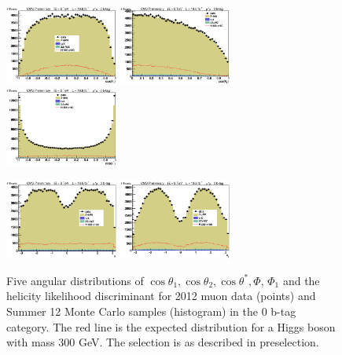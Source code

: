 \begin{figure}[thb!]
\centerline{
\includegraphics[width=0.33\textwidth]{presentation/defense/images/preselection/0/mu/costheta1.eps}
\includegraphics[width=0.33\textwidth]{presentation/defense/images/preselection/0/mu/costheta2.eps}
\includegraphics[width=0.33\textwidth]{presentation/defense/images/preselection/0/mu/costhetast.eps}
}
\centerline{
\includegraphics[width=0.33\textwidth]{presentation/defense/images/preselection/0/mu/phi.eps}
\includegraphics[width=0.33\textwidth]{presentation/defense/images/preselection/0/mu/phi1.eps}
}
\caption{
Five angular distributions of $\cos\theta_1, \cos\theta_2, \cos\theta^*, \Phi$, $\Phi_1$ and the helicity likelihood discriminant for 2012 muon data (points) and Summer 12 Monte Carlo samples (histogram) in the 0 b-tag category.  The red line is the expected distribution for a Higgs boson with mass 300 GeV.  The selection is as described in preselection.
\label{helicityDistDataMCM0}}
\end{figure}
